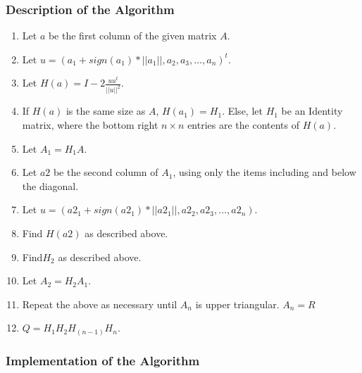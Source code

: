 \documentclass[letterpaper,12pt]{article}
\begin{document}
\subsubsection{Description of the Algorithm}

\begin{enumerate}
\item Let $a$ be the first column of the given matrix $A$.
\item Let $u = (a_1 + sign(a_1) * ||a_1||, a_2, a_3, ..., a_n)^t$.
\item Let $H(a) = I - 2 \frac{uu^t}{||u||^2}$.
\item If $H(a)$ is the same size as $A$, $H(a_1) = H_1$.
  Else, let $H_1$ be an Identity matrix, where the bottom right $n \times n$
  entries are the contents of $H(a)$.
\item Let $A_1 = H_1 A$.
\item Let $a2$ be the second column of $A_1$, using only the items including
  and below the diagonal.
\item Let $u = (a2_1 + sign(a2_1) * ||a2_1||, a2_2, a2_3, ..., a2_n)$.
\item Find $H(a2)$ as described above.
\item Find$H_2$ as described above.
\item Let $A_2 = H_2 A_1$.
\item Repeat the above as necessary until $A_n$ is upper triangular. $A_n = R$
\item $Q = H_1 H_2 H_{(n-1)} H_n$.
\end{enumerate}

\subsubsection{Implementation of the Algorithm}
\end{document}

